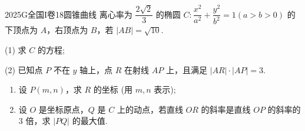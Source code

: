 
\begin{problem}{2025}{G}{全国I卷}{18}{圆锥曲线}
离心率为 $\dfrac{2\sqrt{2}}{3}$ 的椭圆 $C: \dfrac{x^2}{a^2} + \dfrac{y^2}{b^2} = 1 (a>b>0)$ 的下顶点为 $A$，右顶点为 $B$，若 $|AB|=\sqrt{10}$.

(1) 求 $C$ 的方程;

(2) 已知点 $P$ 不在 $y$ 轴上，点 $R$ 在射线 $AP$ 上，且满足 $|AR| \cdot |AP| = 3$.
\begin{enumerate}
\item 设 $P(m,n)$，求 $R$ 的坐标 (用 $m,n$ 表示);
\item 设 $O$ 是坐标原点，$Q$ 是 $C$ 上的动点，若直线 $OR$ 的斜率是直线 $OP$ 的斜率的 3 倍，求 $|PQ|$ 的最大值.
\end{enumerate}
\end{problem}